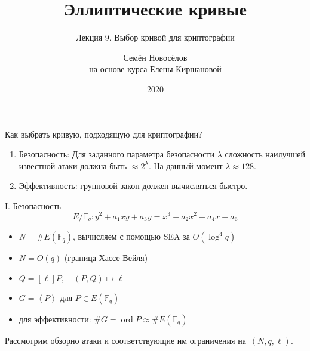 \documentclass{beamer}
\title{Эллиптические кривые}
\subtitle{Лекция 9. Выбор кривой для криптографии}
\author{Семён Новосёлов\\
\footnotesize{на основе курса Елены Киршановой}}
\institute{БФУ им. И. Канта}
\date{2020}
\begin{document}
\frame{\titlepage}


\begin{frame}{Как выбрать кривую, подходящую для криптографии?}
\begin{enumerate}
    \item Безопасность: Для заданного параметра безопасности $\lambda$ сложность наилучшей известной атаки должна быть $\approx 2^\lambda$. На данный момент $\lambda \approx 128$.
    \item Эффективность: групповой закон должен вычисляться быстро.
\end{enumerate}
\end{frame}

\begin{frame}{I. Безопасность}
\[
E/\mathbb{F}_q: y^2 + a_1 x y + a_3 y = x^3 + a_2 x^2 + a_4 x + a_6
\]
\begin{itemize}
    \item $N = \#E(\mathbb{F}_q)$, вычисляем с помощью SEA за $O(\log^4{q})$
    \item $N = O(q)$ (граница Хассе-Вейля)
    \item {}
    $
    Q = [\ell] P, \quad (P, Q) \mapsto \ell
    $
    \item $G = \left<P\right>$ для $P \in E(\mathbb{F}_q)$
    \item для эффективности: $\#G = \operatorname{ord}{P} \approx \#E(\mathbb{F}_q)$
\end{itemize}
Рассмотрим обзорно атаки и соответствующие им ограничения на~$(N,q,\ell)$.
\end{frame}
\end{document}

